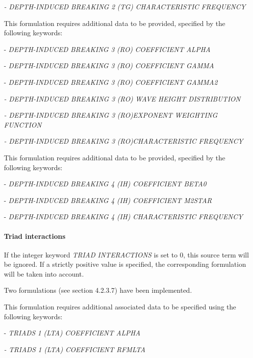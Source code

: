 \textit{- DEPTH-INDUCED BREAKING 2 (TG) CHARACTERISTIC FREQUENCY}

 \textbf{}

 \textbf{}

 This formulation requires additional data to be provided, specified by the following keywords:

 - \textit{DEPTH-INDUCED BREAKING 3 (RO) COEFFICIENT ALPHA}

 - \textit{DEPTH-INDUCED BREAKING 3 (RO) COEFFICIENT GAMMA}

 - \textit{DEPTH-INDUCED BREAKING 3 (RO) COEFFICIENT GAMMA2}

 \textit{- DEPTH-INDUCED BREAKING 3 (RO) WAVE HEIGHT DISTRIBUTION}

 \textit{- DEPTH-INDUCED BREAKING 3 (RO)EXPONENT WEIGHTING FUNCTION}

 \textit{- DEPTH-INDUCED BREAKING 3 (RO)CHARACTERISTIC FREQUENCY}

 \textbf{}

 \textbf{}

 This formulation requires additional data to be provided, specified by the following keywords:

 - \textit{DEPTH-INDUCED BREAKING 4 (IH) COEFFICIENT BETA0}

 - \textit{DEPTH-INDUCED BREAKING 4 (IH) COEFFICIENT M2STAR}

 - \textit{DEPTH-INDUCED BREAKING 4 (IH) CHARACTERISTIC FREQUENCY}

\paragraph{ Triad interactions}

 If the integer keyword \textit{TRIAD INTERACTIONS} is set to 0, this source term will be ignored. If a strictly positive value is specified, the corresponding formulation will be taken into account.

 Two formulations (see section 4.2.3.7) have been implemented.

 \textbf{}

 This formulation requires additional associated data to be specified using the following keywords:

 - \textit{TRIADS 1 (LTA) COEFFICIENT ALPHA }

 \textit{- TRIADS 1 (LTA) COEFFICIENT RFMLTA }

 \textbf{}

